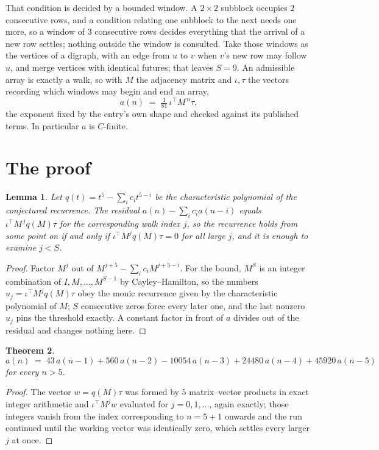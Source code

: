 \documentclass[11pt,a4paper]{article}
\theoremstyle{plain}
\newtheorem{theorem}{Theorem}
\newtheorem{lemma}[theorem]{Lemma}
\theoremstyle{definition}
\begin{document}
That condition is decided by a bounded window. A $2\times2$ subblock occupies $2$ consecutive rows, and a condition relating one subblock to the next needs one more, so a window of $3$ consecutive rows decides everything that the arrival of a new row settles; nothing outside the window is consulted. Take those windows as the vertices of a digraph, with an edge from $u$ to $v$ when $v$'s new row may follow $u$, and merge vertices with identical futures; that leaves $S=9$. An admissible array is exactly a walk, so with $M$ the adjacency matrix and $\iota,\tau$ the vectors recording which windows may begin and end an array,
\[
a(n)\;=\;\tfrac{1}{81}\,\iota^{\!\top}M^{\,n}\tau ,
\]
the exponent fixed by the entry's own shape and checked against its published terms. In
particular $a$ is $C$-finite.

\section{The proof}

\begin{lemma}\label{lem:crit}
Let $q(t)=t^{5}-\sum_i c_it^{5-i}$ be the characteristic polynomial of the
conjectured recurrence. The residual $a(n)-\sum_ic_ia(n-i)$ equals
$\iota^{\!\top}M^{\,j}q(M)\tau$ for the corresponding walk index $j$, so the recurrence
holds from some point on if and only if $\iota^{\!\top}M^{j}q(M)\tau=0$ for all large $j$,
and it is enough to examine $j<S$.
\end{lemma}

\begin{proof}
Factor $M^{j}$ out of $M^{j+5}-\sum_ic_iM^{j+5-i}$. For the bound, $M^{S}$
is an integer combination of $I,M,\dots,M^{S-1}$ by Cayley--Hamilton, so the numbers
$u_j=\iota^{\!\top}M^{j}q(M)\tau$ obey the monic recurrence given by the characteristic
polynomial of $M$; $S$ consecutive zeros force every later one, and the last nonzero $u_j$
pins the threshold exactly. A constant factor in front of $a$ divides out of the residual and
changes nothing here.
\end{proof}

\begin{theorem}
\[
a(n)\;=\;43\,a(n-1) + 560\,a(n-2) - 10054\,a(n-3) + 24480\,a(n-4) + 45920\,a(n-5)
\]
for every $n>5$.
\end{theorem}

\begin{proof}
The vector $w=q(M)\tau$ was formed by $5$ matrix--vector products in exact integer
arithmetic and $\iota^{\!\top}M^{j}w$ evaluated for $j=0,1,\dots$, again exactly; those
integers vanish from the index corresponding to $n=5+1$ onwards and the run continued
until the working vector was identically zero, which settles every larger $j$ at once.
\end{proof}
\end{document}
